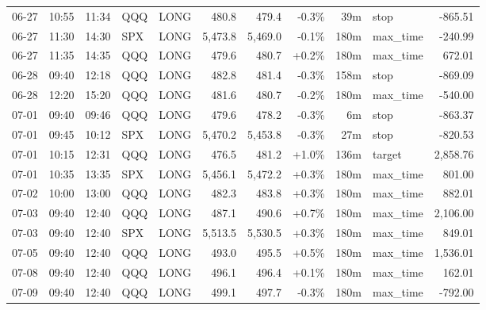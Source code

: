 \documentclass[11pt,a4paper,twoside]{article}
\begin{document}
\begin{center}
\begin{longtable}{>{\color{txtmain}}l l l l l r r r r >{\color{txtmain}}l r}
06-27 & 10:55 & 11:34 & QQQ & LONG & 480.8 & 479.4 & \textcolor{lossred}{-0.3\%} & 39m & stop & \textcolor{lossred}{-865.51} \\
06-27 & 11:30 & 14:30 & SPX & LONG & 5,473.8 & 5,469.0 & \textcolor{lossred}{-0.1\%} & 180m & max\_time & \textcolor{lossred}{-240.99} \\
06-27 & 11:35 & 14:35 & QQQ & LONG & 479.6 & 480.7 & \textcolor{wingreen}{+0.2\%} & 180m & max\_time & \textcolor{wingreen}{672.01} \\
06-28 & 09:40 & 12:18 & QQQ & LONG & 482.8 & 481.4 & \textcolor{lossred}{-0.3\%} & 158m & stop & \textcolor{lossred}{-869.09} \\
06-28 & 12:20 & 15:20 & QQQ & LONG & 481.6 & 480.7 & \textcolor{lossred}{-0.2\%} & 180m & max\_time & \textcolor{lossred}{-540.00} \\
07-01 & 09:40 & 09:46 & QQQ & LONG & 479.6 & 478.2 & \textcolor{lossred}{-0.3\%} & 6m & stop & \textcolor{lossred}{-863.37} \\
07-01 & 09:45 & 10:12 & SPX & LONG & 5,470.2 & 5,453.8 & \textcolor{lossred}{-0.3\%} & 27m & stop & \textcolor{lossred}{-820.53} \\
07-01 & 10:15 & 12:31 & QQQ & LONG & 476.5 & 481.2 & \textcolor{wingreen}{+1.0\%} & 136m & target & \textcolor{wingreen}{2,858.76} \\
07-01 & 10:35 & 13:35 & SPX & LONG & 5,456.1 & 5,472.2 & \textcolor{wingreen}{+0.3\%} & 180m & max\_time & \textcolor{wingreen}{801.00} \\
07-02 & 10:00 & 13:00 & QQQ & LONG & 482.3 & 483.8 & \textcolor{wingreen}{+0.3\%} & 180m & max\_time & \textcolor{wingreen}{882.01} \\
07-03 & 09:40 & 12:40 & QQQ & LONG & 487.1 & 490.6 & \textcolor{wingreen}{+0.7\%} & 180m & max\_time & \textcolor{wingreen}{2,106.00} \\
07-03 & 09:40 & 12:40 & SPX & LONG & 5,513.5 & 5,530.5 & \textcolor{wingreen}{+0.3\%} & 180m & max\_time & \textcolor{wingreen}{849.01} \\
07-05 & 09:40 & 12:40 & QQQ & LONG & 493.0 & 495.5 & \textcolor{wingreen}{+0.5\%} & 180m & max\_time & \textcolor{wingreen}{1,536.01} \\
07-08 & 09:40 & 12:40 & QQQ & LONG & 496.1 & 496.4 & \textcolor{wingreen}{+0.1\%} & 180m & max\_time & \textcolor{wingreen}{162.01} \\
07-09 & 09:40 & 12:40 & QQQ & LONG & 499.1 & 497.7 & \textcolor{lossred}{-0.3\%} & 180m & max\_time & \textcolor{lossred}{-792.00} \\

\end{longtable}
\end{center}
\end{document}
